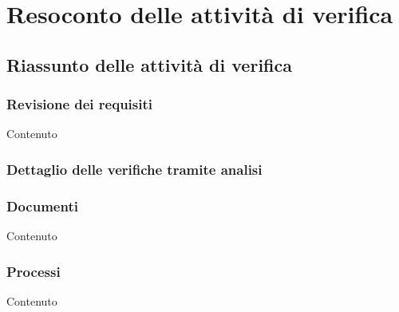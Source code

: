 \newpage
\section{Resoconto delle attività di verifica}

    \subsection{Riassunto delle attività di verifica}

    \subsubsection{Revisione dei requisiti}
    Contenuto

    \subsubsection{Dettaglio delle verifiche tramite analisi}

    \subsubsection{Documenti}
    Contenuto

	\subsubsection{Processi}
	Contenuto
